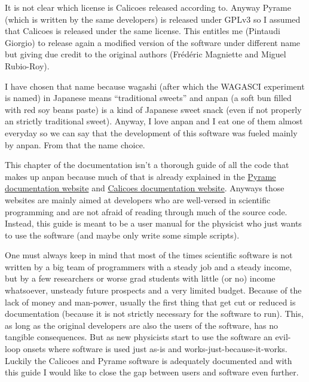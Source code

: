 It is not clear which license is Calicoes released according
to. Anyway Pyrame (which is written by the same developers) is
released under GPLv3 so I assumed that Calicoes is released under the
same license. This entitles me (Pintaudi Giorgio) to release again a
modified version of the software under different name but giving due
credit to the original authors (Frédéric Magniette and Miguel
Rubio-Roy).

I have chosen that name because wagashi (after which the WAGASCI
experiment is named) in Japanese means ``traditional sweets'' and
anpan (a soft bun filled with red soy beans paste) is a kind of
Japanese sweet snack (even if not properly an strictly traditional
sweet). Anyway, I love anpan and I eat one of them almost everyday so
we can say that the development of this software was fueled mainly by
anpan. From that the name choice.

This chapter of the documentation isn't a thorough guide of all the
code that makes up anpan because much of that is already explained in
the \href{http://llr.in2p3.fr/sites/pyrame/documentation/}{Pyrame
  documentation website} and
\href{http://llr.in2p3.fr/sites/pyrame/calicoes/documentation/}{Calicoes
  documentation website}. Anyways those websites are mainly aimed at
developers who are well-versed in scientific programming and are not
afraid of reading through much of the source code. Instead, this guide
is meant to be a user manual for the physicist who just wants to use
the software (and maybe only write some simple scripts).

One must always keep in mind that most of the times scientific
software is not written by a big team of programmers with a steady job
and a steady income, but by a few researchers or worse grad students
with little (or no) income whatsoever, unsteady future prospects and a
very limited budget. Because of the lack of money and man-power,
usually the first thing that get cut or reduced is documentation
(because it is not strictly necessary for the software to run). This,
as long as the original developers are also the users of the software,
has no tangible consequences. But as new physicists start to use the
software an evil-loop onsets where software is used just as-is and
works-just-because-it-works. Luckily the Calicoes and Pyrame software
is adequately documented and with this guide I would like to close the
gap between users and software even further.

